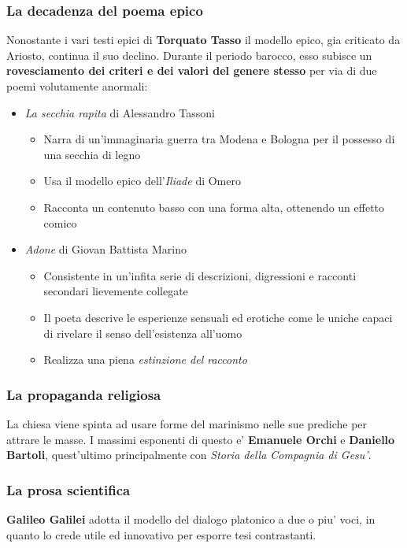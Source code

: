 \documentclass{article}
\begin{document}
{    \subsubsection{La decadenza del poema epico}
    Nonostante i vari testi epici di \textbf{Torquato Tasso} il modello epico, gia criticato da Ariosto, continua il suo declino. Durante il periodo barocco, esso subisce un \textbf{rovesciamento dei criteri e dei valori del genere stesso} per via di due poemi volutamente anormali:
    
    \begin{itemize}
      \item \textit{La secchia rapita} di Alessandro Tassoni
      \begin{itemize}
        \item Narra di un'immaginaria guerra tra Modena e Bologna per il possesso di una secchia di legno
        \item Usa il modello epico dell'\textit{Iliade} di Omero
        \item Racconta un contenuto basso con una forma alta, ottenendo un effetto comico
      \end{itemize}
      \item \textit{Adone} di Giovan Battista Marino
      \begin{itemize}
        \item Consistente in un'infita serie di descrizioni, digressioni e racconti secondari lievemente collegate
        \item Il poeta descrive le esperienze sensuali ed erotiche come le uniche capaci di rivelare il senso dell'esistenza all'uomo
        \item Realizza una piena \textit{estinzione del racconto}
      \end{itemize}
    \end{itemize}

    \subsubsection{La propaganda religiosa}
    La chiesa viene spinta ad usare forme del marinismo nelle sue prediche per attrare le masse. I massimi esponenti di questo e' \textbf{Emanuele Orchi} e \textbf{Daniello Bartoli}, quest'ultimo principalmente con \textit{Storia della Compagnia di Gesu'}.

    \subsubsection{La prosa scientifica}
    \textbf{Galileo Galilei} adotta il modello del dialogo platonico a due o piu' voci, in quanto lo crede utile ed innovativo per esporre tesi contrastanti.

}
\end{document}
